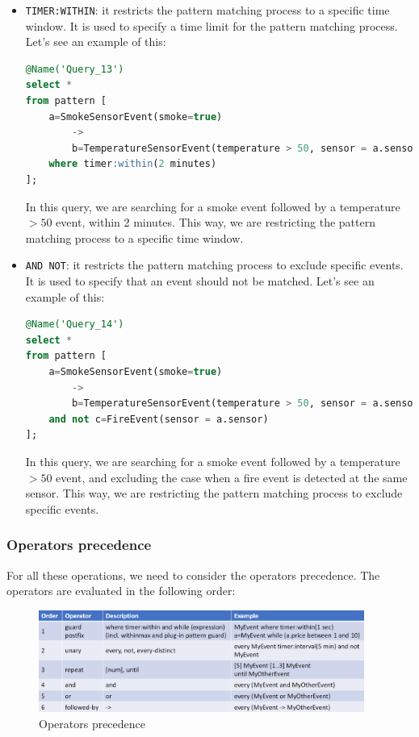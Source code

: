 \begin{itemize}
    \item \texttt{TIMER:WITHIN}: it restricts the pattern matching process to a specific
    time window. It is used to specify a time limit for the pattern matching process.
    Let's see an example of this:\\

    \begin{lstlisting}[language=SQL]
@Name('Query_13')
select *
from pattern [
    a=SmokeSensorEvent(smoke=true) 
        ->
        b=TemperatureSensorEvent(temperature > 50, sensor = a.sensor)
    where timer:within(2 minutes)
];
    \end{lstlisting}

    In this query, we are searching for a smoke event followed by a temperature $> 50$
    event, within 2 minutes. This way, we are restricting the pattern matching process
    to a specific time window.

    \item \texttt{AND NOT}: it restricts the pattern matching process to exclude specific
    events. It is used to specify that an event should not be matched. Let's see an example
    of this:\\

    \begin{lstlisting}[language=SQL]
@Name('Query_14')
select *
from pattern [
    a=SmokeSensorEvent(smoke=true) 
        ->
        b=TemperatureSensorEvent(temperature > 50, sensor = a.sensor)
    and not c=FireEvent(sensor = a.sensor)
];
    \end{lstlisting}

    In this query, we are searching for a smoke event followed by a temperature $> 50$
    event, and excluding the case when a fire event is detected at the same sensor.
    This way, we are restricting the pattern matching process to exclude specific events.

\end{itemize}

\subsubsection{Operators precedence}

For all these operations, we need to consider the operators precedence. The operators
are evaluated in the following order:

\begin{figure}[H]
    \centering
    \includegraphics[width=0.95\textwidth]{figures/image_op_precedence_EPL_CEP.png}
    \caption{Operators precedence}
    \label{fig:operators_precedence}
\end{figure}

